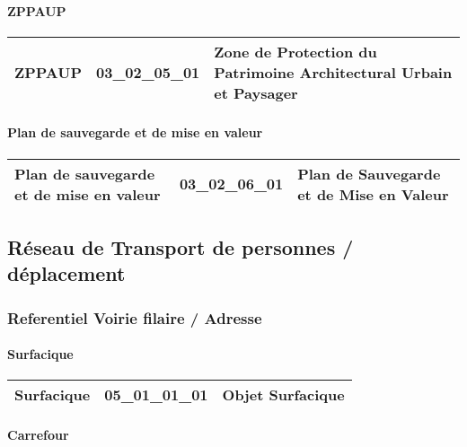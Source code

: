 \documentclass[12pt,titlepage]{book}
\begin{document}
\paragraph{ZPPAUP}
\noindent
\vspace{\baselineskip}

\renewcommand{\arraystretch}{1.2}
\begin{supertabular}{|p{10cm}|c|p{15cm}|}
 ZPPAUP & 03\_02\_05\_01 & Zone de Protection du Patrimoine Architectural Urbain et Paysager\\
\hline
\end{supertabular}


\paragraph{Plan de sauvegarde et de mise en valeur}
\noindent
\vspace{\baselineskip}

\renewcommand{\arraystretch}{1.2}
\begin{supertabular}{|p{10cm}|c|p{15cm}|}
 Plan de sauvegarde et de mise en valeur & 03\_02\_06\_01 & Plan de Sauvegarde et de Mise en Valeur\\
\hline
\end{supertabular}
\subsection{Réseau de Transport de personnes / déplacement}
\subsubsection{\large Referentiel Voirie filaire / Adresse}
\paragraph{Surfacique}
\noindent
\vspace{\baselineskip}

\renewcommand{\arraystretch}{1.2}
\begin{supertabular}{|p{10cm}|c|p{15cm}|}
 Surfacique & 05\_01\_01\_01 & Objet Surfacique\\
\hline
\end{supertabular}


\paragraph{Carrefour}
\noindent
\vspace{\baselineskip}
\end{document}
